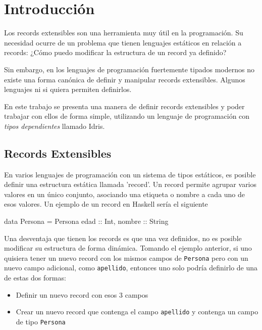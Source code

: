
\chapter{Introducción}
\label{ch:1}

Los records extensibles son una herramienta muy útil en la programación. Su necesidad ocurre de un problema que tienen lenguajes estáticos en relación a records: ¿Cómo puedo modificar la estructura de un record ya definido?

Sin embargo, en los lenguajes de programación fuertemente tipados modernos no existe una forma canónica de definir y manipular records extensibles. Algunos lenguajes ni si quiera permiten definirlos.

En este trabajo se presenta una manera de definir records extensibles y poder trabajar con ellos de forma simple, utilizando un lenguaje de programación con \textit{tipos dependientes} llamado Idris.

\section{Records Extensibles}

En varios lenguajes de programación con un sistema de tipos estáticos, es posible definir una estructura estática llamada 'record'. Un record permite agrupar varios valores en un único conjunto, asociando una etiqueta o nombre a cada uno de esos valores.
Un ejemplo de un record en Haskell sería el siguiente

\begin{code}
data Persona = Persona { edad :: Int, nombre :: String}
\end{code}

Una desventaja que tienen los records es que una vez definidos, no es posible modificar su estructura de forma dinámica. Tomando el ejemplo anterior, si uno quisiera tener un nuevo record con los mismos campos de \texttt{Persona} pero con un nuevo campo adicional, como \texttt{apellido}, entonces uno solo podría definirlo de una de estas dos formas:
\begin{itemize}[noitemsep]
\item Definir un nuevo record con esos 3 campos
\item Crear un nuevo record que contenga el campo \texttt{apellido} y contenga un campo de tipo \texttt{Persona}
\end{itemize}

